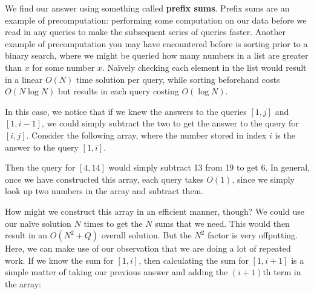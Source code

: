 We find our answer using something called \textbf{prefix sums}. Prefix sums are an example of precomputation: performing some computation on our data before we read in any
queries to make the subsequent series of queries faster. Another example of precomputation you may have encountered before is sorting prior to a binary search, where we might
be queried how many numbers in a list are greater than $x$ for some number $x$. Na\"{i}vely checking each element in the list would result in a linear $O(N)$ time solution
per query, while sorting beforehand costs $O(N \log N)$ but results in each query costing $O(\log N)$.

In this case, we notice that if we knew the answers to the queries $[1,j]$ and $[1,i-1]$, we could simply subtract the two to get the answer to the query for $[i,j]$.
Consider the following array, where the number stored in index $i$ is the answer to the query $[1,i]$.

\begin{center}

\end{center}

Then the query for $[4,14]$ would simply subtract 13 from 19 to get 6. In general, once we have constructed this array, each query takes $O(1)$, since we simply look up
two numbers in the array and subtract them.

How might we construct this array in an efficient manner, though? We could use our na\"{i}ve solution $N$ times to get the $N$ sums that we need. This would then result
in an $O(N^2 + Q)$ overall solution. But the $N^2$ factor is very offputting. Here, we can make use of our observation that we are doing a lot of repeated work. If we know the
sum for $[1,i]$, then calculating the sum for $[1,i+1]$ is a simple matter of taking our previous answer and adding the $(i+1)$th term in the array:

